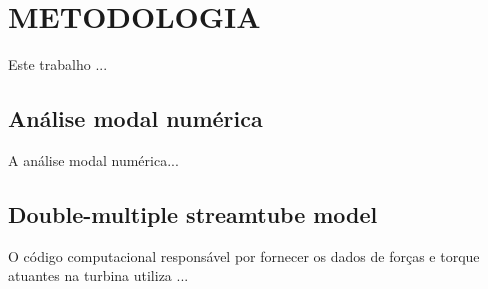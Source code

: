 
\chapter{METODOLOGIA}
\label{chap:metodologia}

Este trabalho ...

\section{Análise modal numérica}
\label{sec:metmodal}

A análise modal numérica...

\section{Double-multiple streamtube model}
\label{sec:metbet}

O código computacional responsável por fornecer os dados de forças e torque atuantes na turbina utiliza ...
 
